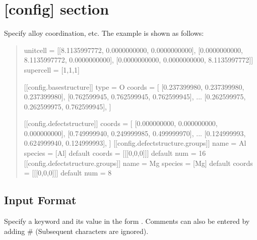 \documentclass[letterpaper,10pt,english]{sphinxmanual}
\begin{document}
\section{{[}config{]} section}
\label{\detokenize{file_specification/parameter_config::doc}}\label{\detokenize{file_specification/parameter_config:config-section}}
Specify alloy coordination, etc.
The example is shown as follows:
\begin{quote}

\begin{sphinxVerbatim}[commandchars=\\\{\}]
[config]
unitcell = [[8.1135997772, 0.0000000000, 0.0000000000],
            [0.0000000000, 8.1135997772, 0.0000000000],
            [0.0000000000, 0.0000000000, 8.1135997772]]
supercell = [1,1,1]

[[config.base\PYGZus{}structure]]
type = \PYGZdq{}O\PYGZdq{}
coords = [
    [0.237399980, 0.237399980, 0.237399980],
    [0.762599945, 0.762599945, 0.762599945],
    ...
    [0.262599975, 0.262599975, 0.762599945],
    ]

[[config.defect\PYGZus{}structure]]
coords = [
    [0.000000000, 0.000000000, 0.000000000],
    [0.749999940, 0.249999985, 0.499999970],
    ...
    [0.124999993, 0.624999940, 0.124999993],
    ]
[[config.defect\PYGZus{}structure.groups]]
name = \PYGZsq{}Al\PYGZsq{}
\PYGZsh{} species = [\PYGZsq{}Al\PYGZsq{}]    \PYGZsh{} default
\PYGZsh{} coords = [[[0,0,0]]]  \PYGZsh{} default
num = 16
[[config.defect\PYGZus{}structure.groups]]
name = \PYGZsq{}Mg\PYGZsq{}
\PYGZsh{} species = [\PYGZsq{}Mg\PYGZsq{}]    \PYGZsh{} default
\PYGZsh{} coords = [[[0,0,0]]]  \PYGZsh{} default
num = 8
\end{sphinxVerbatim}
\end{quote}


\subsection{Input Format}
\label{\detokenize{file_specification/parameter_config:input-format}}
Specify a keyword and its value in the form .
Comments can also be entered by adding \# (Subsequent characters are ignored).
\end{document}
